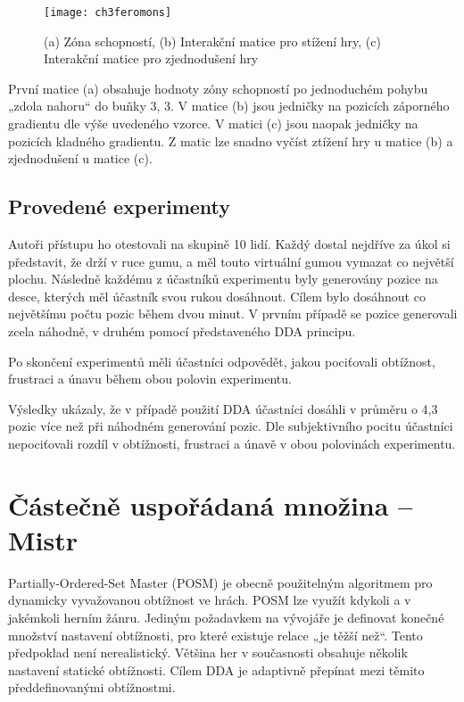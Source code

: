 \begin{figure}
  \centering
  \texttt{[image: ch3feromons]}
	\caption{(a) Zóna schopností, (b) Interakční matice pro stížení hry, (c) Interakční matice pro zjednodušení hry \cite{26poststroke} }
	\label{fig-ch3feromons}
\end{figure}

První matice (a) obsahuje hodnoty zóny schopností po jednoduchém pohybu „zdola nahoru“ do buňky 3, 3. V matice (b) jsou jedničky na pozicích záporného gradientu dle výše uvedeného vzorce. V matici (c) jsou naopak jedničky na pozicích kladného gradientu. Z matic lze snadno vyčíst ztížení hry u matice (b) a zjednodušení u matice (c).

\subsection{Provedené experimenty}

Autoři přístupu ho otestovali na skupině 10 lidí. Každý dostal nejdříve za úkol si představit, že drží v ruce gumu, a měl touto virtuální gumou vymazat co největší plochu. Následně každému z účastníků experimentu byly generovány pozice na desce, kterých měl účastník svou rukou dosáhnout. Cílem bylo dosáhnout co největšímu počtu pozic během dvou minut. V prvním případě se pozice generovali zcela náhodně, v druhém pomocí představeného DDA principu.

Po skončení experimentů měli účastníci odpovědět, jakou pociťovali obtížnost, frustraci a únavu během obou polovin experimentu.

Výsledky ukázaly, že v případě použití DDA účastníci dosáhli v průměru o 4,3 pozic více než při náhodném generování pozic. Dle subjektivního pocitu účastníci nepociťovali rozdíl v obtížnosti, frustraci a únavě v obou polovinách experimentu.

\section{Částečně uspořádaná množina – Mistr}

Partially-Ordered-Set Master (POSM) \cite{22posm1} je obecně použitelným algoritmem pro dynamicky vyvažovanou obtížnost ve hrách. POSM lze využít kdykoli a v jakémkoli herním žánru. Jediným požadavkem na vývojáře je definovat konečné množství nastavení obtížnosti, pro které existuje relace „je těžší než“. Tento předpoklad není nerealistický. Většina her v současnosti obsahuje několik nastavení statické obtížnosti. Cílem DDA je adaptivně přepínat mezi těmito předdefinovanými obtížnostmi.

